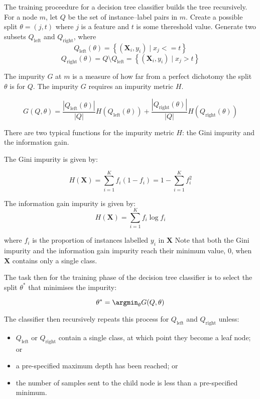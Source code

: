         The training proceedure for a decision tree classifier builds the tree recursively. For a node $m$, let $Q$ be the set of instance--label pairs in $m$. Create a possible split $\theta = (j, t)$ where $j$ is a feature and $t$ is some thereshold value. Generate two subsets $Q_\mathrm{left}$ and $Q_\mathrm{right}$, where 
        $$Q_\mathrm{left}(\theta) = \left\{ (\mathbf{X}_i,y_i) \mid x_j <= t \right \}$$
        $$Q_\mathrm{right}(\theta) = Q \setminus Q_\mathrm{left} = \left\{ (\mathbf{X}_i,y_i) \mid x_j > t \right \}$$
      
        The impurity $G$ at $m$ is a measure of how far from a perfect dichotomy the split $\theta$ is for $Q$. The impurity $G$ requires an impurity metric $H$.
      
        $$G(Q, \theta) = \frac{|Q_\mathrm{left}(\theta)|}{|Q|} H(Q_\mathrm{left}(\theta)) + \frac{|Q_\mathrm{right}(\theta)|}{|Q|} H(Q_\mathrm{right}(\theta))$$
      
        There are two typical functions for the impurity metric $H$: the Gini impurity and the information gain. 
      
        The Gini impurity is given by:
      
        $$H(\mathbf{X}) = \sum \limits_{i=1}^K f_i(1-f_i) = 1 - \sum \limits_{i=1}^K f_i^2$$
      
        The information gain impurity is given by:
        $$H(\mathbf{X}) = \sum \limits_{i=1}^K f_i \log f_i$$
      
        where $f_i$ is the proportion of instances labelled $y_i$ in $\mathbf{X}$ Note that both the Gini impurity and the information gain impurity reach their minimum value, $0$, when $\mathbf{X}$ contains only a single class.
      
        The task then for the training phase of the decision tree classifier is to select the split $\theta^*$ that minimises the impurity:
      
        $$\theta^* = \argmin_\theta G(Q, \theta)$$
      
        The classifier then recursively repeats this process for $Q_\mathrm{left}$ and $Q_\mathrm{right}$ unless:
        \begin{itemize}
          \item $Q_\mathrm{left}$ or $Q_\mathrm{right}$ contain a single class, at which point they become a leaf node; or
          \item a pre-specified maximum depth has been reached; or
          \item the number of samples sent to the child node is less than a pre-specified minimum.
        \end{itemize}
      

